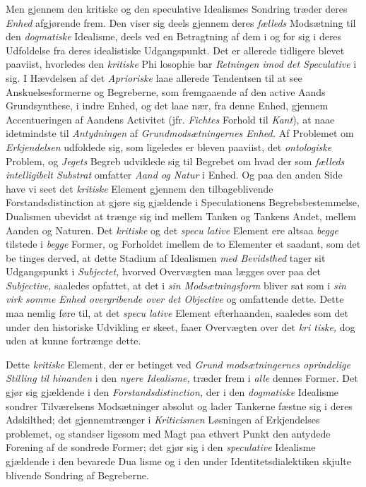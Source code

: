 Men gjennem den kritiske og den speculative Idealismes
Sondring træder deres \emph{Enhed} afgjørende frem. Den viser sig
deels gjennem deres \emph{fælleds} Modsætning til den \emph{dogmatiske}
Idealisme, deels ved en Betragtning af dem i og for sig i
deres Udfoldelse fra deres idealistiske Udgangspunkt. Det er
allerede tidligere blevet paaviist, hvorledes den \emph{kritiske} Phi\-%
losophie bar \emph{Retningen imod det Speculative} i sig. I
Hævdelsen af det \emph{Aprioriske} laae allerede Tendentsen til at
see Anskuelsesformerne og Begreberne, som fremgaaende af
den active Aands Grundsynthese, i indre Enhed, og det laae
nær, fra denne Enhed, gjennem Accentueringen af Aandens
Activitet (jfr. \emph{Fichtes} Forhold til \emph{Kant}), at naae idetmindste
til \emph{Antydningen} af \emph{Grundmodsætningernes Enhed.}
Af Problemet om \emph{Erkjendelsen} udfoldede sig, som ligeledes
er bleven paaviist, det \emph{ontologiske} Problem, og \emph{Jegets}
Begreb udviklede sig til Begrebet om hvad der som \emph{fælleds
intelligibelt Substrat} omfatter \emph{Aand og Natur} i Enhed.
Og paa den anden Side have vi seet det \emph{kritiske} Element
gjennem den tilbageblivende Forstandsdistinction at gjøre sig
gjældende i Speculationens Begrebsbestemmelse, Dualismen
ubevidst at trænge sig ind mellem Tanken og Tankens Andet,
mellem Aanden og Naturen. Det \emph{kritiske} og det \emph{specu\-%
lative} Element ere altsaa \emph{begge} tilstede i \emph{begge} Former,
og Forholdet imellem de to Elementer et saadant, som det be\-%
tinges derved, at dette Stadium af Idealismen \emph{med Bevidsthed}
tager sit Udgangspunkt i \emph{Subjectet,} hvorved Overvægten
maa lægges over paa det \emph{Subjective,} saaledes opfattet, at
det i \emph{sin Modsætningsform} bliver sat som i \emph{sin virk\-%
somme Enhed overgribende over det Objective} og
omfattende dette. Dette maa nemlig føre til, at det \emph{specu\-%
lative} Element efterhaanden, saaledes som det under den
historiske Udvikling er skeet, faaer Overvægten over det \emph{kri\-%
tiske,} dog uden at kunne fortrænge dette.

Dette \emph{kritiske} Element, der er betinget ved \emph{Grund\-%
modsætningernes oprindelige Stilling til hinanden}
i den \emph{nyere Idealisme,} træder frem i \emph{alle} dennes Former.
Det gjør sig gjældende i den \emph{Forstandsdistinction,} der i
den \emph{dogmatiske} Idealisme sondrer Tilværelsens Modsætninger
absolut og lader Tankerne fæstne sig i deres Adskilthed; det
gjennemtrænger i \emph{Kriticismen} Løsningen af Erkjendelses\-%
problemet, og standser ligesom med Magt paa ethvert Punkt
den antydede Forening af de sondrede Former; det gjør sig
i den \emph{speculative} Idealisme gjældende i den bevarede Dua\-%
lisme og i den under Identitetsdialektiken skjulte blivende
Sondring af Begreberne.

